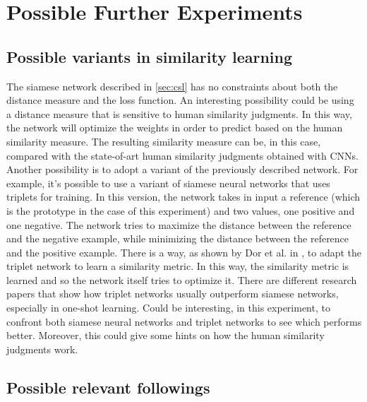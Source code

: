 \documentclass[conference]{IEEEtran}
\begin{document}
	\section{Possible Further Experiments}
	
		\subsection{Possible variants in similarity learning}
		
			\noindent The siamese network described in \ref{sec:csl} has no constraints about both the distance measure and the loss function. An interesting possibility could be using a distance measure that is sensitive 
			to human similarity judgments. In this way, the network will optimize the weights in order to predict based on the human similarity measure. The resulting similarity measure can be, in this case, 
			compared with the state-of-art human similarity judgments obtained with CNNs.\\
			Another possibility is to adopt a variant of the previously described network. For example, it's possible to use a variant of siamese neural networks that uses triplets for training. In this version, 
			the network takes in input a reference (which is the prototype in the case of this experiment) and two values, one positive and one negative. The network tries to maximize the distance between the reference and 
			the negative example, while minimizing the distance between the reference and the positive example. There is a way, as shown by Dor et al. in \cite{ein-dor-etal-2018-learning}, to adapt the triplet 
			network to learn a similarity metric. In this way, the similarity metric is learned and so the network itself tries to optimize it. There are different research papers that show how triplet networks 
			usually outperform siamese networks, especially in one-shot learning. Could be interesting, in this experiment, to confront both siamese neural networks and triplet networks to see which performs better. 
			Moreover, this could give some hints on how the human similarity judgments work.
		
		\subsection{Possible relevant followings}
	
\end{document}

